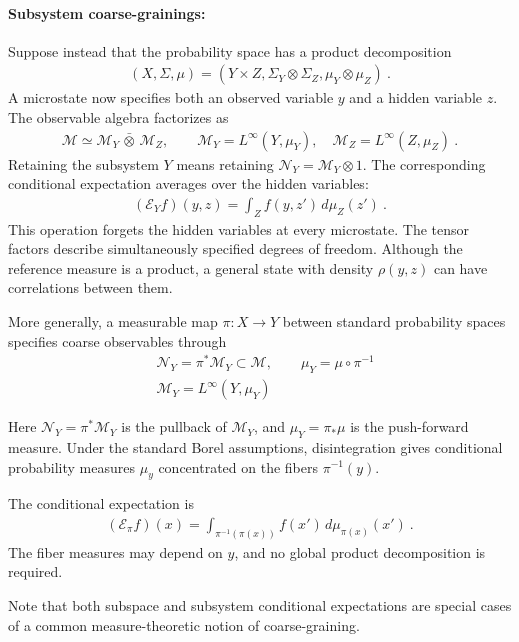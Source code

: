 \documentclass[a4paper,11pt]{article}
\theoremstyle{definition}
\newcommand{\nn}{\nonumber}
\newcommand{\mN}{\mathcal{N}}
\newcommand{\mM}{\mathcal{M}}
\newcommand{\mE}{\mathcal{E}}
\begin{document}
\paragraph{Subsystem coarse-grainings:}
Suppose instead that the probability space has a product decomposition
\begin{align}
    (X,\Sigma,\mu)=(Y\times Z,\Sigma_Y\otimes\Sigma_Z,\mu_Y\otimes\mu_Z)\ .
\end{align}
A microstate now specifies both an observed variable $y$ and a hidden variable $z$. The observable algebra factorizes as
\begin{align}
    \mM\simeq\mM_Y\,\bar\otimes\,\mM_Z,
    \qquad \mM_Y=L^\infty(Y,\mu_Y),\quad
    \mM_Z=L^\infty(Z,\mu_Z)\ .
\end{align}
Retaining the subsystem $Y$ means retaining $\mN_Y=\mM_Y\otimes 1$. The corresponding conditional expectation averages over the hidden variables:
\begin{align}
    (\mE_Y f)(y,z)=\int_Z f(y,z')\,d\mu_Z(z')\ .
\end{align}
This operation forgets the hidden variables at every microstate. The tensor factors describe simultaneously specified degrees of freedom. Although the reference measure is a product, a general state with density $\rho(y,z)$ can have correlations between them.

More generally, a measurable map $\pi:X\to Y$ between standard probability spaces specifies coarse observables through
\begin{align}
    &\mN_Y=\pi^*\mM_Y\subset \mM,
    \qquad \mu_Y=\mu\circ \pi^{-1}\nn\\
    &\mM_Y=L^\infty(Y,\mu_Y)
\end{align}

Here $\mN_Y=\pi^*\mM_Y$ is the pullback of $\mM_Y$, and $\mu_Y=\pi_*\mu$ is the
push-forward measure. Under the standard Borel assumptions, disintegration gives
conditional probability measures $\mu_y$ concentrated on the fibers $\pi^{-1}(y)$.

The conditional expectation is
\begin{align}
    (\mE_\pi f)(x)=\int_{\pi^{-1}(\pi(x))}f(x')\,d\mu_{\pi(x)}(x')\ .
\end{align}
The fiber measures may depend on $y$, and no global product decomposition is required.

Note that both subspace and subsystem conditional expectations are special cases of a common measure-theoretic notion of coarse-graining.
\end{document}
